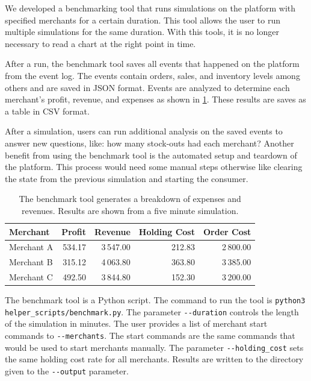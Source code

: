 We developed a benchmarking tool that runs simulations on the \pricewars platform with specified merchants for a certain duration.
This tool allows the user to run multiple simulations for the same duration.
With this tools, it is no longer necessary to read a chart at the right point in time.

After a run, the benchmark tool saves all events that happened on the platform from the event log.
The events contain orders, sales, and inventory levels among others and are saved in JSON format.
Events are analyzed to determine each merchant's profit, revenue, and expenses as shown in \cref{tab:benchmark_tool}.
These results are saves as a table in CSV format.

After a simulation, users can run additional analysis on the saved events to answer new questions, like: how many stock-outs had each merchant?
Another benefit from using the benchmark tool is the automated setup and teardown of the platform.
This process would need some manual steps otherwise like clearing the state from the previous simulation and starting the consumer.

\begin{table}[t]
	\centering
	\begin{tabular}{ lrrrr }
		\toprule
		\textbf{Merchant} & \textbf{Profit} & \textbf{Revenue} & \textbf{Holding Cost} & \textbf{Order Cost} \\
		\midrule
		Merchant A & 534.17 & 3\,547.00 & 212.83 & 2\,800.00 \\
		Merchant B & 315.12 & 4\,063.80 & 363.80 & 3\,385.00 \\
		Merchant C & 492.50 & 3\,844.80 & 152.30 & 3\,200.00 \\
		\bottomrule
	\end{tabular}
	\caption[Benchmark Tool: Breakdown of Expenses and Revenues]{The benchmark tool generates a breakdown of expenses and revenues. Results are shown from a five minute simulation.}
	\label{tab:benchmark_tool}
\end{table}

The benchmark tool is a Python script.
The command to run the tool is \texttt{python3 helper\_scripts/benchmark.py}.
The parameter \texttt{-{}-duration} controls the length of the simulation in minutes.
The user provides a list of merchant start commands to \texttt{-{}-merchants}.
The start commands are the same commands that would be used to start merchants manually.
The parameter \texttt{-{}-holding\_cost} sets the same holding cost rate for all merchants. 
Results are written to the directory given to the \texttt{-{}-output} parameter.
